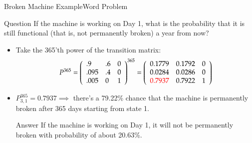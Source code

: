 \documentclass[10pt]{beamer}
\begin{document}
\begin{frame}{Broken Machine Example}{Word Problem}

\begin{example}{Question}
If the machine is working on Day 1, what is the probability that it is still functional (that is, not permanently broken) a year from now?
\end{example}



   \begin{itemize}

      \item Take the 365'th power of the transition matrix:
         $$P^{365} =
         \left(%
         \begin{array}{lll}
           .9 & .6 & 0 \\
           .095 & .4 & 0 \\
           .005 & 0 & 1 \\
         \end{array}%
         \right)^{365} =
         \left(%
         \begin{array}{lll}
             0.1779 & 0.1792 & 0 \\
             0.0284 & 0.0286 & 0 \\
             \textcolor{red}{0.7937} & 0.7922 & 1
         \end{array}%
         \right)
         $$
    
    
    \item $P^{365}_{3,1} = 0.7937 \implies $ there's a 79.22\% chance that the machine is permanently broken after 365 days starting from state 1.  

    \begin{block}{Answer}
    If the machine is working on Day 1, it will not be permanently broken with probability of about 20.63\%. 
    \end{block}
   \end{itemize}
   
\end{frame}
\end{document}
